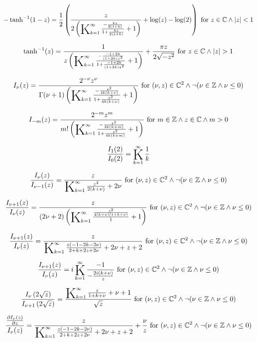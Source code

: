 \documentclass{article}
\newcommand{\bigK}{\mathop{\raisebox{-5pt}{\huge K}}}
\begin{document}
\[-\tanh ^{-1}(1-z)=\frac{1}{2} \left(\frac{z}{2 \left(\bigK_{k=1}^{\infty}\frac{-\frac{k z}{2 (1+k)}}{1+\frac{k z}{2 (1+k)}}+1\right)}+\log (z)-\log (2)\right)\text{ for }z\in \mathbb{C}\land \left| z\right| <1\] 

\[\tanh ^{-1}(z)=\frac{1}{z \left(\bigK_{k=1}^{\infty}\frac{-\frac{-1+2 k}{(1+2 k) z^2}}{1+\frac{-1+2 k}{(1+2 k) z^2}}+1\right)}+\frac{\pi  z}{2 \sqrt{-z^2}}\text{ for }z\in \mathbb{C}\land \left| z\right| >1\] 

\[I_{\nu }(z)=\frac{2^{-\nu } z^{\nu }}{\Gamma (\nu +1) \left(\bigK_{k=1}^{\infty}\frac{-\frac{z^2}{4 k (k+\nu )}}{1+\frac{z^2}{4 k (k+\nu )}}+1\right)}\text{ for }(\nu ,z)\in \mathbb{C}^2\land \neg (\nu \in \mathbb{Z}\land \nu \leq 0)\] 

\[I_{-m}(z)=\frac{2^{-m} z^m}{m! \left(\bigK_{k=1}^{\infty}\frac{-\frac{z^2}{4 k (k+m)}}{1+\frac{z^2}{4 k (k+m)}}+1\right)}\text{ for }m\in \mathbb{Z}\land z\in \mathbb{C}\land m>0\] 

\[\frac{I_1(2)}{I_0(2)}=\bigK_{k=1}^{\infty}\frac{1}{k}\] 

\[\frac{I_{\nu }(z)}{I_{\nu -1}(z)}=\frac{z}{\bigK_{k=1}^{\infty}\frac{z^2}{2 (k+\nu )}+2 \nu }\text{ for }(\nu ,z)\in \mathbb{C}^2\land \neg (\nu \in \mathbb{Z}\land \nu \leq 0)\] 

\[\frac{I_{\nu +1}(z)}{I_{\nu }(z)}=\frac{z}{(2 \nu +2) \left(\bigK_{k=1}^{\infty}\frac{\frac{z^2}{4 (k+\nu ) (1+k+\nu )}}{1}+1\right)}\text{ for }(\nu ,z)\in \mathbb{C}^2\land \neg (\nu \in \mathbb{Z}\land \nu \leq 0)\] 

\[\frac{I_{\nu +1}(z)}{I_{\nu }(z)}=\frac{z}{\bigK_{k=1}^{\infty}\frac{z (-1-2 k-2 \nu )}{2+k+2 z+2 \nu }+2 \nu +z+2}\text{ for }(\nu ,z)\in \mathbb{C}^2\land \neg (\nu \in \mathbb{Z}\land \nu \leq 0)\] 

\[\frac{I_{\nu +1}(z)}{I_{\nu }(z)}=i \bigK_{k=1}^{\infty}\frac{-1}{-\frac{2 i (k+\nu )}{z}}\text{ for }(\nu ,z)\in \mathbb{C}^2\land \neg (\nu \in \mathbb{Z}\land \nu \leq 0)\] 

\[\frac{I_{\nu }\left(2 \sqrt{z}\right)}{I_{\nu +1}\left(2 \sqrt{z}\right)}=\frac{\bigK_{k=1}^{\infty}\frac{z}{1+k+\nu }+\nu +1}{\sqrt{z}}\text{ for }(\nu ,z)\in \mathbb{C}^2\land \neg (\nu \in \mathbb{Z}\land \nu \leq 0)\] 

\[\frac{\frac{\partial I_{\nu }(z)}{\partial z}}{I_{\nu }(z)}=\frac{z}{\bigK_{k=1}^{\infty}\frac{z (-1-2 k-2 \nu )}{2+k+2 z+2 \nu }+2 \nu +z+2}+\frac{\nu }{z}\text{ for }(\nu ,z)\in \mathbb{C}^2\land \neg (\nu \in \mathbb{Z}\land \nu \leq 0)\] 
\end{document}
